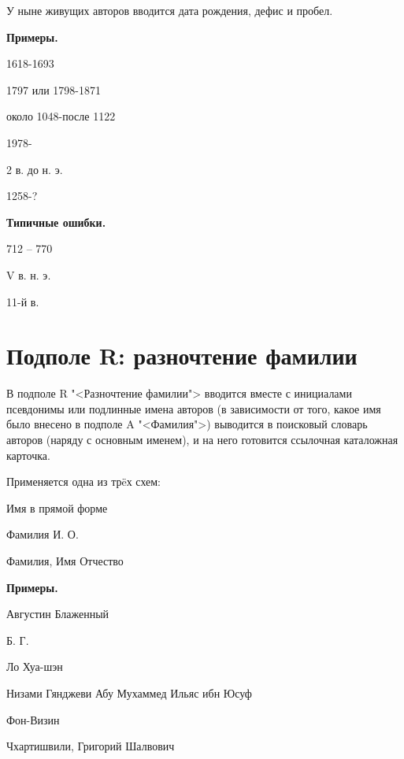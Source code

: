 У ныне живущих авторов вводится дата рождения, дефис и пробел.

\textbf{Примеры.}

\begin{cutelist}
    \item 1618-1693
    \item 1797 или 1798-1871
    \item около 1048-после 1122
    \item 1978-
    \item 2 в. до н. э.
    \item 1258-?
\end{cutelist}

\textbf{Типичные ошибки.}

\begin{cutelist}
    \item 712 -- 770
    \item V в. н. э.
    \item 11-й в.
\end{cutelist}

\section{Подполе R: разночтение фамилии}

В подполе R "<Разночтение фамилии"> вводится вместе с инициалами псевдонимы или подлинные имена авторов (в зависимости от того, какое имя было внесено в подполе A "<Фамилия">) выводится в поисковый словарь авторов (наряду с основным именем), и на него готовится ссылочная каталожная карточка.

Применяется одна из тр\"eх схем:

\begin{cutelist}
    \item Имя в прямой форме
    \item Фамилия И. О.
    \item Фамилия, Имя Отчество
\end{cutelist}

\textbf{Примеры.}

\begin{cutelist}
    \item Августин Блаженный
    \item Б. Г.
    \item Ло Хуа-шэн
    \item Низами Гянджеви Абу Мухаммед Ильяс ибн Юсуф
    \item Фон-Визин
    \item Чхартишвили, Григорий Шалвович
\end{cutelist}

